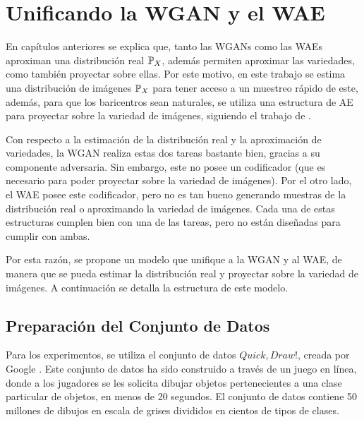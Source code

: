\chapter{Unificando la WGAN y el WAE}\label{chap:WAE-WGAN}  %

En capítulos anteriores se explica que, tanto las WGANs como las WAEs aproximan una distribución real $\Prob_X$, además permiten aproximar las variedades, como también proyectar sobre ellas.
Por este motivo, en este trabajo se estima una distribución de imágenes $\Prob_X$ para tener acceso a un muestreo rápido de este, además, para que los baricentros sean naturales, se utiliza una estructura de AE para proyectar sobre la variedad de imágenes, siguiendo el trabajo de \cite{simon2020barycenters}.


Con respecto a la estimación de la distribución real y la aproximación de variedades, la WGAN realiza estas dos tareas bastante bien, gracias a su componente adversaria. Sin embargo, este no posee un codificador (que es necesario para poder proyectar sobre la variedad de imágenes). Por el otro lado, el WAE posee este codificador, pero no es tan bueno generando muestras de la distribución real o aproximando la variedad de imágenes. Cada una de estas estructuras cumplen bien con una de las tareas, pero no están diseñadas para cumplir con ambas.


Por esta razón, se propone un modelo que unifique a la WGAN y al WAE, de manera que se pueda estimar la distribución real y proyectar sobre la variedad de imágenes. A continuación se detalla la estructura de este modelo.

\section{Preparación del Conjunto de Datos}\label{ssec:preparacion-dataset}  %

Para los experimentos, se utiliza el conjunto de datos $Quick, Draw!$, creada por Google \cite{jongejan2016quick}. Este conjunto de datos ha sido construido a través de un juego en línea, donde a los jugadores se les solicita dibujar objetos pertenecientes a una clase particular de objetos, en menos de 20 segundos. El conjunto de datos contiene 50 millones de dibujos en escala de grises divididos en cientos de tipos de clases.

